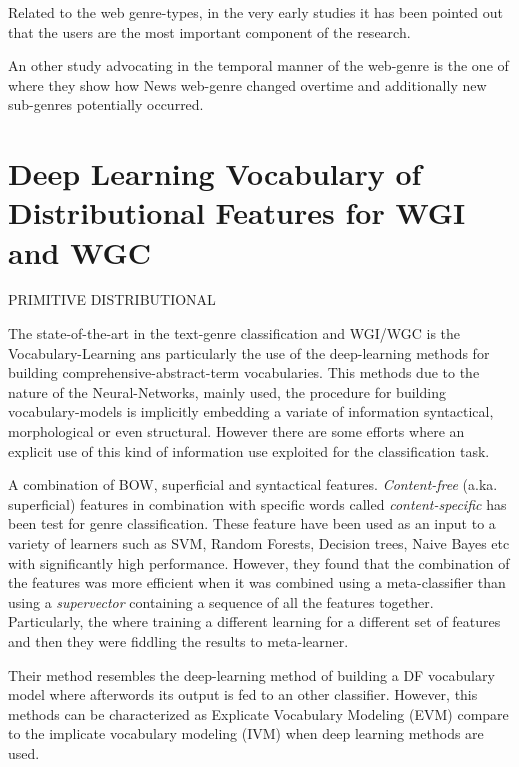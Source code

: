 Related to the web genre-types, in the very early studies it has been pointed out that the users are the most important component of the research. 

An other study advocating in the temporal manner of the web-genre is the one of  \parencite{caple2017genre} where they show how News web-genre changed overtime and additionally new sub-genres potentially occurred.



\section{Deep Learning Vocabulary of Distributional Features for WGI and WGC}\label{chap:relevant_work:sec:intro}


PRIMITIVE DISTRIBUTIONAL \parencite{kim2010formulating} 


The state-of-the-art in the text-genre classification and WGI/WGC is the Vocabulary-Learning ans particularly the use of the deep-learning methods for building comprehensive-abstract-term vocabularies. This methods due to the nature of the Neural-Networks, mainly used,  the procedure for building vocabulary-models is implicitly embedding a variate of information syntactical, morphological or even structural. However there are some efforts where an explicit use of this kind of information use exploited for the classification task. 

A combination of BOW, superficial and syntactical features. \textit{Content-free} (a.ka. superficial) features in combination with specific words called \textit{content-specific} has been test for genre classification. These feature have been used as an input to a variety of learners such as SVM, Random Forests, Decision trees, Naive Bayes etc with significantly high performance. However, they found that the combination of the features was more efficient when it was combined using a meta-classifier than using a \textit{supervector} containing a sequence of all the features together. Particularly, the where training a different learning for a different set of features and then they were fiddling the results to meta-learner\parencite{lee2017text}.

Their method resembles the deep-learning method of building a DF vocabulary model where afterwords its output is fed to an other classifier. However, this methods can be characterized as Explicate Vocabulary Modeling (EVM) compare to the implicate vocabulary modeling (IVM) when deep learning methods are used.

